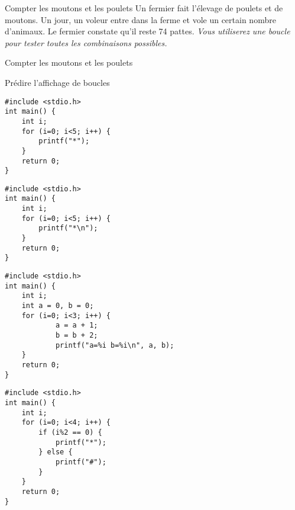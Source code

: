 \begin{UPSTIexercice}{Compter les moutons et les poulets}
  Un fermier fait l'élevage de poulets et de moutons. Un jour, un voleur entre dans la ferme et vole un certain nombre d'animaux. Le fermier constate qu'il reste 74 pattes.
  \textit{Vous utiliserez une boucle pour tester toutes les combinaisons possibles.} 
\end{UPSTIexercice}

\begin{UPSTIprofOnlyEnv}
\begin{UPSTIcorrectionP}{Compter les moutons et les poulets}
    
\end{UPSTIcorrectionP}
\end{UPSTIprofOnlyEnv}

 \begin{UPSTIexercice}{Prédire l'affichage de boucles}
   \begin{lstlisting}
#include <stdio.h>
int main() {
    int i;
    for (i=0; i<5; i++) {
        printf("*");
    }
    return 0;
}
   \end{lstlisting}
   \begin{lstlisting}
#include <stdio.h>
int main() {
    int i;
    for (i=0; i<5; i++) {
        printf("*\n");
    }
    return 0;
}
   \end{lstlisting}
   \begin{lstlisting}
#include <stdio.h>
int main() {
    int i;
    int a = 0, b = 0;
    for (i=0; i<3; i++) {
            a = a + 1;
            b = b + 2;
            printf("a=%i b=%i\n", a, b);
    }
    return 0;
}
   \end{lstlisting}
   \begin{lstlisting}
#include <stdio.h>
int main() {
    int i;  
    for (i=0; i<4; i++) {
        if (i%2 == 0) {
            printf("*");
        } else {
            printf("#");
        }
    }
    return 0;
}
   \end{lstlisting}
 \end{UPSTIexercice}